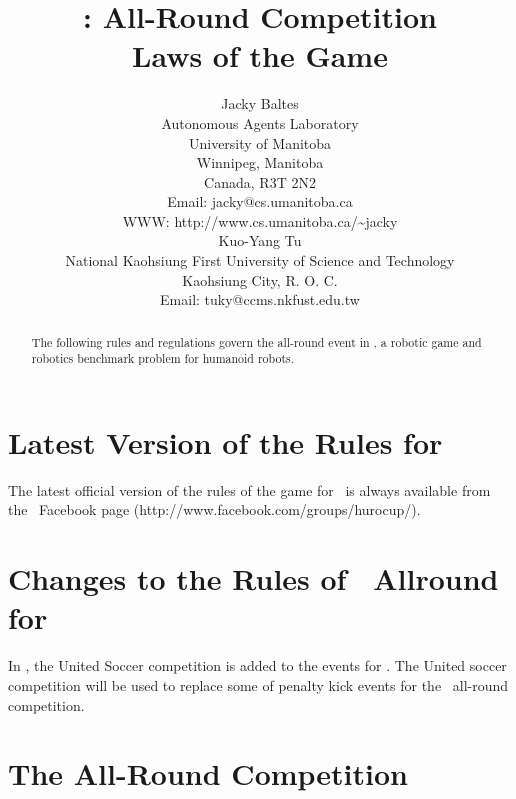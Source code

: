 \documentclass[12pt]{hurocup}
\begin{document}


\title{\HuroCup: All-Round Competition\\
  Laws of the Game \thisyear}


\author{Jacky Baltes\\
Autonomous Agents Laboratory\\
University of Manitoba\\
Winnipeg, Manitoba\\
Canada, R3T 2N2\\
Email: jacky@cs.umanitoba.ca\\
WWW: http://www.cs.umanitoba.ca/\~{ }jacky\\[5mm]
Kuo-Yang Tu\\
National Kaohsiung First University of Science and Technology\\
Kaohsiung City, R. O. C.\\
Email: tuky@ccms.nkfust.edu.tw\\
}

\maketitle
\begin{abstract}
The following rules and regulations govern the all-round event in
\HuroCup, a robotic game and robotics benchmark problem for humanoid
robots.
%
\end{abstract}

\section*{Latest Version of the Rules for \HuroCup}
\label{sec:updates}

The latest official version of the rules of the game for \HuroCup\ is
always available from the \HuroCup\ Facebook page
(http://www.facebook.com/groups/hurocup/).

\section*{Changes to the Rules of \HuroCup\ Allround for \thisyear}

In \thisyear, the United Soccer competition is added to the events for
\HuroCup. The United soccer competition will be used to replace some
of penalty kick events for the \HuroCup\ all-round competition.

\newpage

\section{The All-Round Competition}
\label{sec:all-round} 
\end{document}
